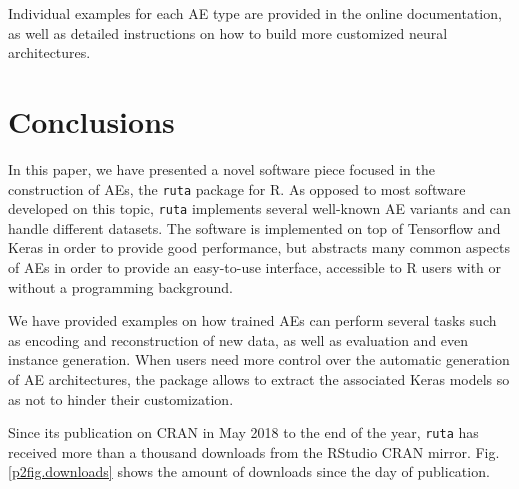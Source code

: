 

Individual examples for each AE type are provided in the online documentation, as well as detailed instructions on how to build more customized neural architectures.

%




\section{Conclusions}
\label{p2sec.conclusions}


In this paper, we have presented a novel software piece focused in the construction of AEs, the \texttt{ruta} package for R. As opposed to most software developed on this topic, \texttt{ruta} implements several well-known AE variants and can handle different datasets. The software is implemented on top of Tensorflow and Keras in order to provide good performance{, but abstracts many common aspects of AEs in order to provide an easy-to-use interface, accessible to R users with or without a programming background}.

We have provided examples on how trained AEs can perform several tasks such as encoding and reconstruction of new data, as well as evaluation and even instance generation. {When users need more control over the automatic generation of AE architectures, the package allows to extract the associated Keras models so as not to hinder their customization.}

{Since its publication on CRAN in May 2018 to the end of the year, \texttt{ruta} has received more than a thousand downloads from the RStudio CRAN mirror. Fig. \ref{p2fig.downloads} shows the amount of downloads since the day of publication.}

